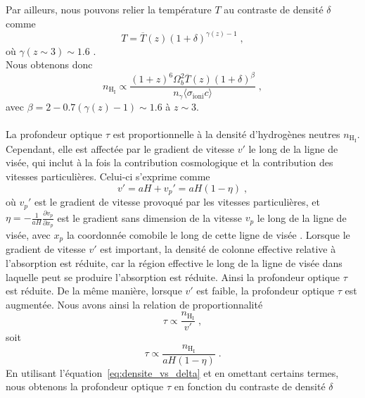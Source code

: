 Par ailleurs, nous pouvons relier la température $T$ au contraste de densité $\delta$ comme
\begin{equation}
  T = \overline T(z)(1+\delta)^{\gamma(z) -1 } \; ,
\end{equation}
où $\gamma (z \sim 3) \sim \num{1.6}$ \autocite{Hui1996}. \\
Nous obtenons donc 
\begin{equation}
  \label{eq:densite_vs_delta}
  n_{\mathrm{H}_{\mathrm{I}}} \propto \frac{(1+z)^6 \Omega_b^2 \overline T(z) (1+\delta)^{\beta}}{n_{\gamma} \langle \sigma_{\mathrm{ioni}} c \rangle} \; ,
\end{equation}
avec $\beta = 2 - \num{0.7}(\gamma(z) -1) \sim \num{1.6}$ à $z \sim 3$.

\paragraph{}
La profondeur optique $\tau$ est proportionnelle à la densité d'hydrogènes neutres $n_{\mathrm{H}_{\mathrm{I}}}$. Cependant, elle est affectée par le gradient de vitesse $v'$ le long de la ligne de visée, qui inclut à la fois la contribution cosmologique et la contribution des vitesses particulières. Celui-ci s'exprime comme
\begin{equation}
  v' = a H + v_p' = a H (1 - \eta) \; ,
\end{equation}
où $v_p'$ est le gradient de vitesse provoqué par les vitesses particulières, et  $\displaystyle \eta = - \frac{1}{aH} \frac{\partial v_p}{\partial x_p}$ est le gradient sans dimension de la vitesse $v_p$ le long de la ligne de visée, avec $x_p$ la coordonnée comobile le long de cette ligne de visée \autocite{Arinyo-i-Prats2015}.
Lorsque le gradient de vitesse $v'$ est important, la densité de colonne effective relative à l'absorption \lya{} est réduite, car la région effective le long de la ligne de visée dans laquelle peut se produire l'absorption est réduite. Ainsi la profondeur optique $\tau$ est réduite. De la même manière, lorsque $v'$ est faible, la profondeur optique $\tau$ est augmentée. Nous avons ainsi la relation de proportionnalité
\begin{equation}
  \tau \propto \frac{  n_{\mathrm{H}_{\mathrm{I}}}}{v'} \; ,
\end{equation}
soit
\begin{equation}
  \tau \propto \frac{  n_{\mathrm{H}_{\mathrm{I}}}}{a H (1 - \eta)} \; .
\end{equation}
En utilisant l'équation~\ref{eq:densite_vs_delta} et en omettant certains termes, nous obtenons la profondeur optique $\tau$ en fonction du contraste de densité $\delta$

